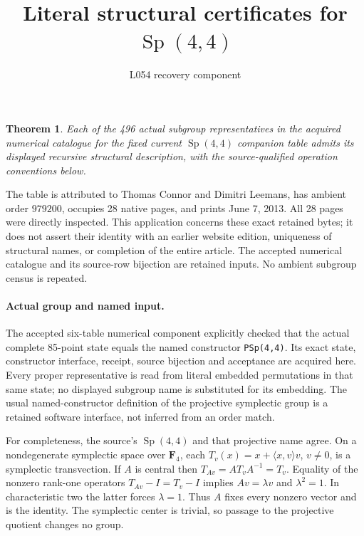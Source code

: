 \documentclass[11pt]{article}
\title{Literal structural certificates for $\operatorname{Sp}(4,4)$}
\author{L054 recovery component}\date{}
\newtheorem{theorem}{Theorem}\newtheorem{lemma}{Lemma}
\begin{document}
\maketitle
\begin{theorem}
Each of the 496 actual subgroup representatives in the acquired numerical
catalogue for the fixed current $\operatorname{Sp}(4,4)$ companion table
admits its displayed recursive structural description, with the
source-qualified operation conventions below.
\end{theorem}
The table is attributed to Thomas Connor and Dimitri Leemans, has ambient
order $979200$, occupies 28 native pages, and prints June 7, 2013.
All 28 pages were directly inspected. This application concerns these exact
retained bytes; it does not assert their identity with an earlier website
edition, uniqueness of structural names, or completion of the entire article.
The accepted numerical catalogue and its source-row bijection are retained
inputs. No ambient subgroup census is repeated.

\paragraph{Actual group and named input.}
The accepted six-table numerical component explicitly checked that the
actual complete 85-point state equals the named constructor
\texttt{PSp(4,4)}. Its exact state, constructor interface, receipt, source
bijection and acceptance are acquired here. Every proper representative is
read from literal embedded permutations in that same state; no displayed
subgroup name is substituted for its embedding.
The usual named-constructor definition of the projective symplectic group
is a retained software interface, not inferred from an order match.

For completeness, the source's $\operatorname{Sp}(4,4)$ and that projective
name agree. On a nondegenerate symplectic space over $\mathbf F_4$, each
$T_v(x)=x+\langle x,v\rangle v$, $v\ne0$, is a symplectic transvection.
If $A$ is central then $T_{Av}=AT_vA^{-1}=T_v$. Equality of the nonzero rank-one operators
$T_{Av}-I=T_v-I$ implies $Av=\lambda v$ and $\lambda^2=1$.
In characteristic two the latter forces $\lambda=1$. Thus $A$ fixes every
nonzero vector and is the identity. The symplectic center is trivial,
so passage to the projective quotient changes no group.
\end{document}
